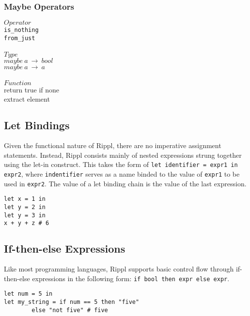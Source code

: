 \documentclass[5pt]{article}
\begin{document}
\subsubsection{Maybe Operators}
\begin{multicols}{3}
\noindent $Operator$ \\
\hspace*{5mm} \texttt{is\_nothing} \\
\hspace*{5mm} \texttt{from\_just} \\
\columnbreak \\
\noindent $Type$ \\
$maybe \ a \ \rightarrow \  bool$ \\
$maybe \ a \ \rightarrow \  a$ \\
\columnbreak \\
\noindent $Function$ \\
return true if none \\
extract element \\
\end{multicols}
\pagebreak


\subsection{Let Bindings}
Given the functional nature of Rippl, there are no imperative assignment statements. Instead, Rippl consists mainly of nested expressions strung together
using the let-in construct. This takes the form of \texttt{let identifier = expr1 in expr2}, where \texttt{indentifier} serves as a name binded to the value of \texttt{expr1} to be used in \texttt{expr2}. The value of a let binding chain is the value of the last expression.
\begin{lstlisting}[language=rippl]
let x = 1 in 
let y = 2 in 
let y = 3 in
x + y + z # 6
\end{lstlisting}

\subsection{If-then-else Expressions}
Like most programming languages, Rippl supports basic control flow through if-then-else expressions in the following form:
\texttt{if bool then expr else expr}.

\begin{lstlisting}[language=rippl]
let num = 5 in
let my_string = if num == 5 then "five" 
        else "not five" # five
\end{lstlisting}
\end{document}
